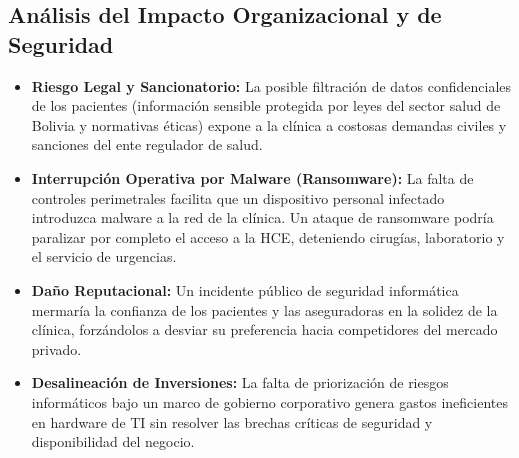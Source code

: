 \subsection{Análisis del Impacto Organizacional y de Seguridad}
\begin{itemize}
    \item \textbf{Riesgo Legal y Sancionatorio:} La posible filtración de datos confidenciales de los pacientes (información sensible protegida por leyes del sector salud de Bolivia y normativas éticas) expone a la clínica a costosas demandas civiles y sanciones del ente regulador de salud.
    \item \textbf{Interrupción Operativa por Malware (Ransomware):} La falta de controles perimetrales facilita que un dispositivo personal infectado introduzca malware a la red de la clínica. Un ataque de ransomware podría paralizar por completo el acceso a la HCE, deteniendo cirugías, laboratorio y el servicio de urgencias.
    \item \textbf{Daño Reputacional:} Un incidente público de seguridad informática mermaría la confianza de los pacientes y las aseguradoras en la solidez de la clínica, forzándolos a desviar su preferencia hacia competidores del mercado privado.
    \item \textbf{Desalineación de Inversiones:} La falta de priorización de riesgos informáticos bajo un marco de gobierno corporativo genera gastos ineficientes en hardware de TI sin resolver las brechas críticas de seguridad y disponibilidad del negocio.
\end{itemize}
